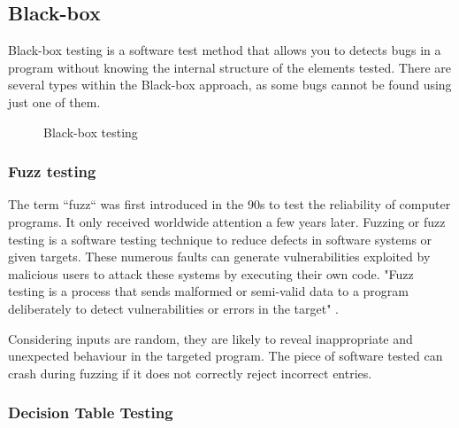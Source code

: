     
    

\subsection{Black-box}
Black-box testing is a software test method that allows you to detects bugs in a program without knowing the internal structure of the elements tested. There are several types within the Black-box approach, as some bugs cannot be found using just one of them.

\begin{figure}[ht]
    \centering
    \caption{Black-box testing}
    \label{fig:black-box testing}
\end{figure}


\subsubsection{Fuzz testing}

The term ``fuzz`` was first introduced in the 90s to test the reliability of computer programs. It only received worldwide attention a few years later. Fuzzing or fuzz testing is a software testing technique to reduce defects in software systems or given targets. These numerous faults can generate vulnerabilities exploited by malicious users to attack these systems by executing their own code. "Fuzz testing is a process that sends malformed or semi-valid data to a program deliberately to detect vulnerabilities or errors in the target" \cite{zhang_discover_2018}.

Considering inputs are random, they are likely to reveal inappropriate and unexpected behaviour in the targeted program. The piece of software tested can crash during fuzzing if it does not correctly reject incorrect entries. 

\subsubsection{Decision Table Testing}


